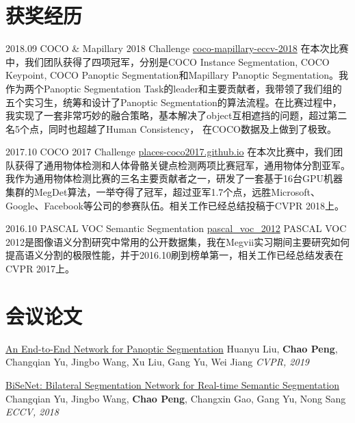 \documentclass[]{friggeri-cv}
\begin{document}
\section{获奖经历}
  \begin{entrylist}
  \entry
    {2018.09}
    {COCO \& Mapillary 2018 Challenge}
    {\href{http://cocodataset.org/workshop/coco-mapillary-eccv-2018.html}{coco-mapillary-eccv-2018}}
    {在本次比赛中，我们团队获得了四项冠军，分别是COCO Instance Segmentation, COCO Keypoint, COCO Panoptic Segmentation和Mapillary Panoptic Segmentation。我作为两个Panoptic Segmentation Task的leader和主要贡献者，我带领了我们组的五个实习生，统筹和设计了Panoptic Segmentation的算法流程。在比赛过程中，我实现了一套非常巧妙的融合策略，基本解决了object互相遮挡的问题，超过第二名5个点，同时也超越了Human Consistency，
    在COCO数据及上做到了极致。}

  \entry
    {2017.10}
    {COCO 2017 Challenge}
    {\href{https://places-coco2017.github.io/}{places-coco2017.github.io}}
    {在本次比赛中，我们团队获得了通用物体检测和人体骨骼关键点检测两项比赛冠军，通用物体分割亚军。我作为通用物体检测比赛的三名主要贡献者之一，研发了一套基于16台GPU机器集群的MegDet算法，一举夺得了冠军，超过亚军1.7个点，远胜Microsoft、Google、Facebook等公司的参赛队伍。相关工作已经总结投稿于CVPR 2018上。}

  \entry
    {2016.10}
    {PASCAL VOC Semantic Segmentation}
    {\href{http://host.robots.ox.ac.uk:8080/leaderboard/displaylb.php?challengeid=11&compid=6}{pascal\_voc\_2012}}
    {PASCAL VOC 2012是图像语义分割研究中常用的公开数据集，我在Megvii实习期间主要研究如何提高语义分割的极限性能，并于2016.10刷到榜单第一，相关工作已经总结发表在CVPR 2017上。}
  \end{entrylist}

\section{会议论文}
\href{https://arxiv.org/abs/1903.05027}{An End-to-End Network for Panoptic Segmentation}\newline
Huanyu Liu, \textbf{Chao Peng}, Changqian Yu, Jingbo Wang, Xu Liu, Gang Yu, Wei Jiang\newline
\emph{CVPR, 2019}

\href{https://arxiv.org/pdf/1808.00897.pdf}{BiSeNet: Bilateral Segmentation Network for Real-time Semantic Segmentation}\newline
Changqian Yu, Jingbo Wang, \textbf{Chao Peng}, Changxin Gao, Gang Yu, Nong Sang\newline
\emph{ECCV, 2018}
\end{document}
